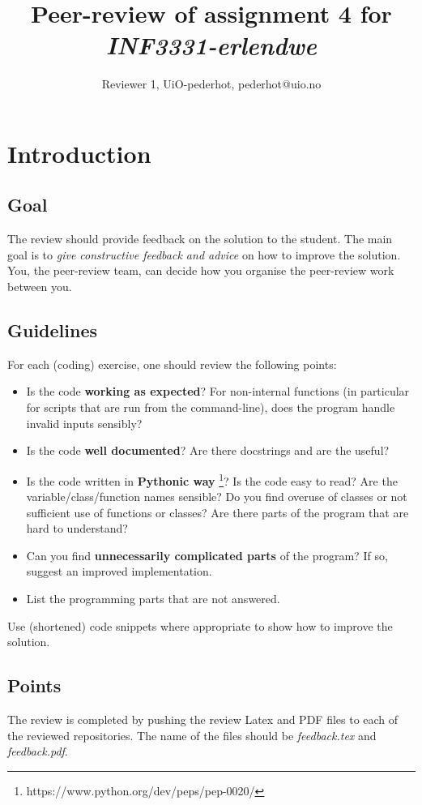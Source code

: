 \documentclass[a4paper]{article}
\title{Peer-review of assignment 4 for \textit{INF3331-erlendwe}}
\author{Reviewer 1, UiO-pederhot, {pederhot@uio.no}}
\begin{document}
\maketitle

\section{Introduction}
\subsection{Goal}
The review should provide feedback on the solution to the student. The main goal is to \emph{give constructive feedback and advice} on how to improve the solution. You, the peer-review team, can decide how you organise the peer-review work between you. 

\subsection{Guidelines}\label{sec:general_review}
For each (coding) exercise, one should review the following points:

\begin{itemize}
  \item Is the code \textbf{working as expected}? For non-internal functions (in particular for scripts that are run from the command-line), does the program handle invalid inputs sensibly?
  \item Is the code \textbf{well documented}? Are there docstrings and are the useful?
  \item Is the code written in \textbf{Pythonic way} \footnote{https://www.python.org/dev/peps/pep-0020/}? Is the code easy to read? Are the variable/class/function names sensible? Do you find overuse of classes or not sufficient use of functions or classes? Are there parts of the program that are hard to understand? 
  \item Can you find \textbf{unnecessarily complicated parts} of the program? If so, suggest an improved implementation.
  \item List the programming parts that are not answered.
\end{itemize}
Use (shortened) code snippets where appropriate to show how to improve the solution. 

\subsection{Points}
The review is completed by pushing the review Latex and PDF files to each of the reviewed repositories. The name of the files should be \emph{feedback.tex} and \emph{feedback.pdf}.
\end{document}
